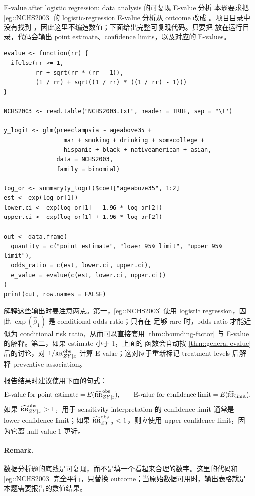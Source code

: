 \begin{exercisesolution}{E-value after logistic regression: data analysis}{ 的可复现 E-value 分析}
本题要求把 \cref{eg::NCHS2003} 的 logistic-regression E-value 分析从 outcome  改成 。项目目录中没有找到 ，因此这里不编造数值；下面给出完整可复现代码。只要把  放在运行目录，代码会输出 point estimate、confidence limits，以及对应的 E-values。

\begin{lstlisting}
evalue <- function(rr) {
  ifelse(rr >= 1,
         rr + sqrt(rr * (rr - 1)),
         (1 / rr) + sqrt((1 / rr) * ((1 / rr) - 1)))
}

NCHS2003 <- read.table("NCHS2003.txt", header = TRUE, sep = "\t")

y_logit <- glm(preeclampsia ~ ageabove35 +
                 mar + smoking + drinking + somecollege +
                 hispanic + black + nativeamerican + asian,
               data = NCHS2003,
               family = binomial)

log_or <- summary(y_logit)$coef["ageabove35", 1:2]
est <- exp(log_or[1])
lower.ci <- exp(log_or[1] - 1.96 * log_or[2])
upper.ci <- exp(log_or[1] + 1.96 * log_or[2])

out <- data.frame(
  quantity = c("point estimate", "lower 95% limit", "upper 95% limit"),
  odds_ratio = c(est, lower.ci, upper.ci),
  e_value = evalue(c(est, lower.ci, upper.ci))
)
print(out, row.names = FALSE)
\end{lstlisting}

解释这些输出时要注意两点。第一，\cref{eg::NCHS2003} 使用 logistic regression，因此 $\exp(\hat\beta_1)$ 是 conditional odds ratio；只有在  足够 rare 时，odds ratio 才能近似为 conditional risk ratio，从而可以直接套用 \cref{thm::bounding-factor} 与 E-value 的解释。第二，如果 estimate 小于 $1$，上面的  函数会自动按 \cref{thm::general-evalue} 后的讨论，对 $1/\textsc{rr}_{ZY\mid x}^{\textup{obs}}$ 计算 E-value；这对应于重新标记 treatment levels 后解释 preventive association。

报告结果时建议使用下面的句式：
\[
\text{E-value for point estimate}
=E(\widehat{\textsc{rr}}_{ZY\mid x}^{\textup{obs}}),
\qquad
\text{E-value for confidence limit}
=E(\widehat{\textsc{rr}}_{\textup{limit}}).
\]
如果 $\widehat{\textsc{rr}}_{ZY\mid x}^{\textup{obs}}>1$，用于 sensitivity interpretation 的 confidence limit 通常是 lower confidence limit；如果 $\widehat{\textsc{rr}}_{ZY\mid x}^{\textup{obs}}<1$，则应使用 upper confidence limit，因为它离 null value $1$ 更近。

\paragraph{Remark.}
数据分析题的底线是可复现，而不是填一个看起来合理的数字。这里的代码和 \cref{eg::NCHS2003} 完全平行，只替换 outcome；当原始数据可用时，输出表格就是本题需要报告的数值结果。
\end{exercisesolution}

